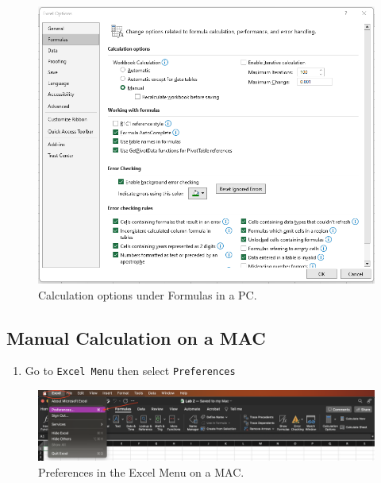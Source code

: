 \documentclass[
]{book}
\providecommand{\tightlist}{%
  \setlength{\itemsep}{0pt}\setlength{\parskip}{0pt}}
\begin{document}
\begin{figure}

{\centering \includegraphics[width=0.8\linewidth]{images/manualcalc-pc} 

}

\caption{Calculation options under Formulas in a PC.}\label{fig:manualcalc-pc}
\end{figure}

\hypertarget{manual-calculation-on-a-mac}{%
\subsection{Manual Calculation on a MAC}\label{manual-calculation-on-a-mac}}

\begin{enumerate}
\def\labelenumi{\arabic{enumi}.}
\tightlist
\item
  Go to \texttt{Excel\ Menu} then select \texttt{Preferences}
\end{enumerate}

\begin{figure}

{\centering \includegraphics[width=0.9\linewidth]{images/manual-calculation1} 

}

\caption{Preferences in the Excel Menu on a MAC.}\label{fig:manual-calculation1}
\end{figure}
\end{document}
